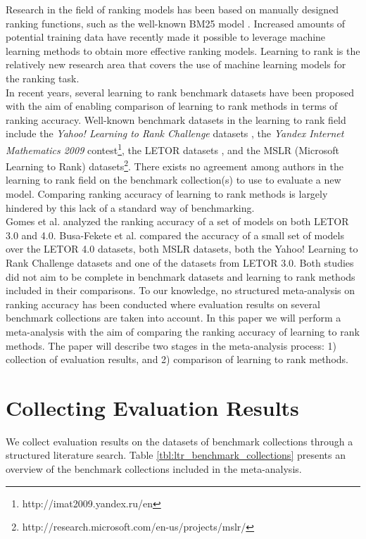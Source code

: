 \documentclass[english, authoryear, preprint]{elsarticle}
\begin{document}
Research in the field of ranking models has been based on manually designed ranking functions, such as the well-known BM25 model \cite{Robertson1994}. Increased amounts of potential training data have recently made it possible to leverage machine learning methods to obtain more effective ranking models. Learning to rank is the relatively new research area that covers the use of machine learning models for the ranking task.\\

In recent years, several learning to rank benchmark datasets have been proposed with the aim of enabling comparison of learning to rank methods in terms of ranking accuracy. Well-known benchmark datasets in the learning to rank field include the \emph{Yahoo! Learning to Rank Challenge} datasets \cite{Chapelle2011a}, the \emph{Yandex Internet Mathematics 2009} contest\footnote{http://imat2009.yandex.ru/en}, the LETOR datasets \cite{Qin2010}, and the MSLR (Microsoft Learning to Rank) datasets\footnote{http://research.microsoft.com/en-us/projects/mslr/}. There exists no agreement among authors in the learning to rank field on the benchmark collection(s) to use to evaluate a new model. Comparing ranking accuracy of learning to rank methods is largely hindered by this lack of a standard way of benchmarking.\\

Gomes et al. \cite{Gomes2013} analyzed the ranking accuracy of a set of models on both LETOR 3.0 and 4.0. Busa-Fekete et al. \cite{Busa-Fekete2013} compared the accuracy of a small set of models over the LETOR 4.0 datasets, both MSLR datasets, both the Yahoo! Learning to Rank Challenge datasets and one of the datasets from LETOR 3.0. Both studies did not aim to be complete in benchmark datasets and learning to rank methods included in their comparisons. To our knowledge, no structured meta-analysis on ranking accuracy has been conducted where evaluation results on several benchmark collections are taken into account. In this paper we will perform a meta-analysis with the aim of comparing the ranking accuracy of learning to rank methods. The paper will describe two stages in the meta-analysis process: 1) collection of evaluation results, and 2) comparison of learning to rank methods.

\section{Collecting Evaluation Results}
\label{sec:collecting_evaluation_results}
We collect evaluation results on the datasets of benchmark collections through a structured literature search. Table \ref{tbl:ltr_benchmark_collections} presents an overview of the benchmark collections included in the meta-analysis.
\end{document}
